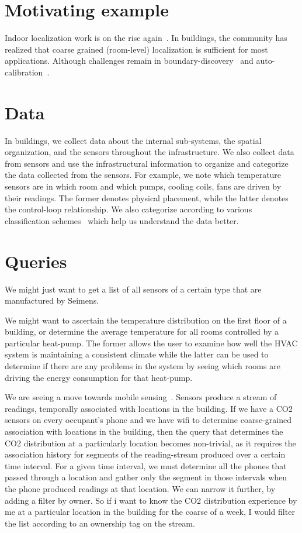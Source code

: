 \section{Motivating example}

Indoor localization work is on the rise again~\cite{papers}.  In buildings, the community has realized that coarse 
grained (room-level) localization is sufficient for most applications.  Although challenges remain in 
boundary-discovery~\cite{papers} and auto-calibration~\cite{papers}.

\section{Data}
In buildings, we collect data about the internal sub-systems, the spatial organization, and the sensors throughout the 
infrastructure.  We also collect data from sensors and use the infrastructural information to organize and categorize
the data collected from the sensors.  For example, we note which temperature sensors are in which room and which pumps,
cooling coils, fans are driven by their readings.  The former denotes physical placement, while the latter denotes
the control-loop relationship.  We also categorize according to various classification schemes~\cite{paper} 
which help us understand the data better.

\section{Queries}

We might just want to get a list of all sensors of a certain type that are manufactured by Seimens.

We might want to ascertain the temperature distribution on the first floor
of a building, or determine the average temperature for all rooms controlled by a particular heat-pump.  The former allows the
user to examine how well the HVAC system is maintaining a consistent climate while the latter can be used to determine if
there are any problems in the system by seeing which rooms are driving the energy consumption for that heat-pump.

We are seeing a move towards mobile sensing~\cite{paper}.  Sensors produce a stream of readings,
temporally associated with locations in the building.  If we have a CO2 sensors on every occupant's phone 
and we have wifi to determine coarse-grained association with locations in the building, then the query that determines the
CO2 distribution at a particularly location becomes non-trivial, as it requires the association history for segments of the 
reading-stream produced over a certain time interval.  For a given time interval, we must determine all the phones
that passed through a location and gather only the segment in those intervals when the phone produced readings at that location.
We can narrow it further, by adding a filter by owner.  So if i want to know the CO2 distribution experience by me at a particular
location in the building for the coarse of a week, I would filter the list according to an ownership tag on the stream.

